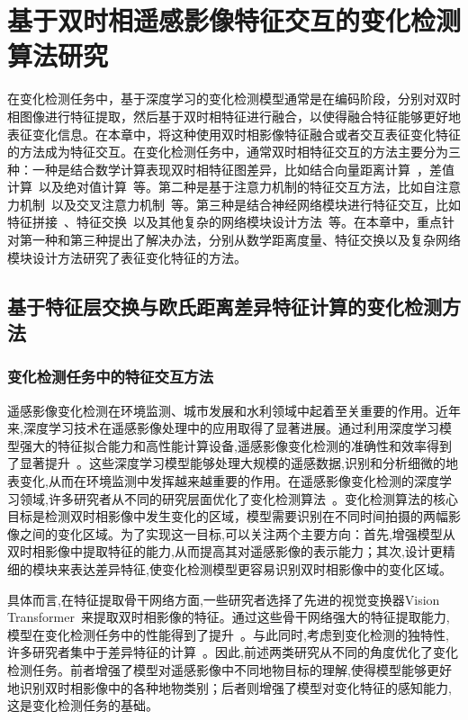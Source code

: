 
\chapter{基于双时相遥感影像特征交互的变化检测算法研究}
在变化检测任务中，基于深度学习的变化检测模型通常是在编码阶段，分别对双时相图像进行特征提取，然后基于双时相特征进行融合，以使得融合特征能够更好地表征变化信息。在本章中，将这种使用双时相影像特征融合或者交互表征变化特征的方法成为特征交互。在变化检测任务中，通常双时相特征交互的方法主要分为三种：一种是结合数学计算表现双时相特征图差异，比如结合向量距离计算~\cite{dong2024changeclip}，差值计算~\cite{h_wei_spatio-temporal_2024}以及绝对值计算~\cite{shi_deeply_2022}等。第二种是基于注意力机制的特征交互方法，比如自注意力机制~\cite{Ying2024DGMA2NetAD}以及交叉注意力机制~\cite{lu_cross_2024}等。第三种是结合神经网络模块进行特征交互，比如特征拼接~\cite{chen2024changemamba}、特征交换~\cite{Fang2022ChangerFI}以及其他复杂的网络模块设计方法~\cite{Zhu2025Change3DRC}等。在本章中，重点针对第一种和第三种提出了解决办法，分别从数学距离度量、特征交换以及复杂网络模块设计方法研究了表征变化特征的方法。

\section{基于特征层交换与欧氏距离差异特征计算的变化检测方法}
\subsection{变化检测任务中的特征交互方法}

遥感影像变化检测在环境监测、城市发展和水利领域中起着至关重要的作用。近年来,深度学习技术在遥感影像处理中的应用取得了显著进展。通过利用深度学习模型强大的特征拟合能力和高性能计算设备,遥感影像变化检测的准确性和效率得到了显著提升~\cite{Chen2021FCCDNFC}。这些深度学习模型能够处理大规模的遥感数据,识别和分析细微的地表变化,从而在环境监测中发挥越来越重要的作用。在遥感影像变化检测的深度学习领域,许多研究者从不同的研究层面优化了变化检测算法~\cite{chen_remote_2022, Fang2022ChangerFI}。变化检测算法的核心目标是检测双时相影像中发生变化的区域，模型需要识别在不同时间拍摄的两幅影像之间的变化区域。为了实现这一目标,可以关注两个主要方向：首先,增强模型从双时相影像中提取特征的能力,从而提高其对遥感影像的表示能力；其次,设计更精细的模块来表达差异特征,使变化检测模型更容易识别双时相影像中的变化区域。

具体而言,在特征提取骨干网络方面,一些研究者选择了先进的视觉变换器Vision Transformer~\cite{Dosovitskiy2020AnII}来提取双时相影像的特征。通过这些骨干网络强大的特征提取能力,模型在变化检测任务中的性能得到了提升~\cite{He2015DeepRL, Gu2023MambaLS, Dosovitskiy2020AnII}。与此同时,考虑到变化检测的独特性,许多研究者集中于差异特征的计算~\cite{dong_changeclip_2024, dong_efficientcd_2024}。因此,前述两类研究从不同的角度优化了变化检测任务。前者增强了模型对遥感影像中不同地物目标的理解,使得模型能够更好地识别双时相影像中的各种地物类别；后者则增强了模型对变化特征的感知能力,这是变化检测任务的基础。

